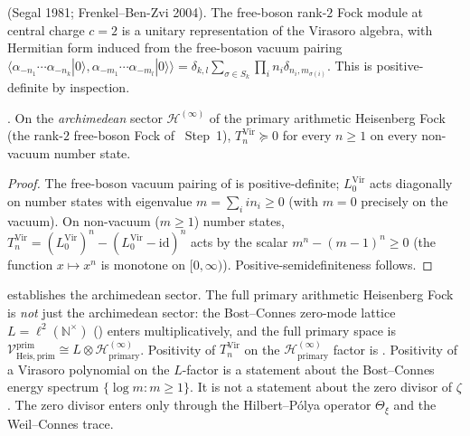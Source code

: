 \begin{theorem}[\(c=2\) free-field unitarity]
\label{v4-arith:vb:thm:c=2-free-field-unitarity}
\ClaimStatusProvedElsewhere (Segal 1981; Frenkel--Ben-Zvi 2004).
The free-boson rank-\(2\) Fock module at central charge \(c=2\) is a
unitary representation of the Virasoro algebra, with Hermitian form
induced from the free-boson vacuum pairing
\(\langle\alpha_{-n_{1}}\cdots\alpha_{-n_{k}}|0\rangle,\alpha_{-m_{1}}\cdots\alpha_{-m_{l}}|0\rangle\rangle=\delta_{k,l}\sum_{\sigma\in S_{k}}\prod_{i}n_{i}\delta_{n_{i},m_{\sigma(i)}}\).
This is positive-definite by inspection.
\end{theorem}

\begin{corollary}
\label{v4-arith:vb:cor:archimedean-positivity}
\ClaimStatusProvedHere. On the \emph{archimedean} sector
\(\mathcal{H}^{(\infty)}\) of the primary arithmetic Heisenberg Fock
(the rank-\(2\) free-boson Fock of
~Step~1), \(T_{n}^{\mathrm{Vir}}\succeq 0\) for every
\(n\geq 1\) on every non-vacuum number state.
\end{corollary}

\begin{proof}
The free-boson vacuum pairing of 
is positive-definite; \(L_{0}^{\mathrm{Vir}}\) acts diagonally on
number states with eigenvalue \(m=\sum_{i}i n_{i}\geq 0\) (with \(m=0\)
precisely on the vacuum). On non-vacuum (\(m\geq 1\)) number states,
\(T_{n}^{\mathrm{Vir}}=(L_{0}^{\mathrm{Vir}})^{n}-(L_{0}^{\mathrm{Vir}}-\mathrm{id})^{n}\) acts by the scalar
\(m^{n}-(m-1)^{n}\geq 0\) (the function \(x\mapsto x^{n}\) is monotone on
\([0,\infty)\)). Positive-semidefiniteness follows.
\end{proof}

\begin{remark}
\label{v4-arith:vb:rem:missing-sector}
 establishes the
archimedean sector. The full primary arithmetic Heisenberg Fock is
\emph{not} just the archimedean sector: the Bost--Connes zero-mode
lattice \(L=\ell^{2}(\mathbb{N}^{\times})\)
() enters multiplicatively, and
the full primary space is
\(\mathcal{V}^{\mathrm{prim}}_{\mathrm{Heis},\mathrm{prim}}\cong L\otimes\mathcal{H}^{(\infty)}_{\mathrm{primary}}\).
Positivity of \(T_{n}^{\mathrm{Vir}}\) on the \(\mathcal{H}^{(\infty)}_{\mathrm{primary}}\)
factor is . Positivity
of a Virasoro polynomial on the \(L\)-factor is a statement about the
Bost--Connes energy spectrum \(\{\log m:m\geq1\}\). It is not a
statement about the zero divisor of \(\zeta\). The zero divisor enters
only through the Hilbert--P\'olya operator \(\Theta_{\xi}\) and the
Weil--Connes trace.
\end{remark}

